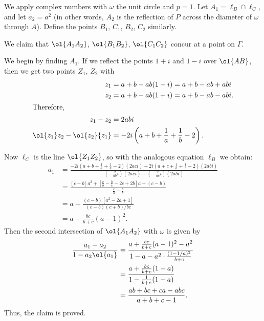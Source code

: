 We apply complex numbers with $\omega$ the unit circle and $p=1$.  Let $A_1 = \ell_B \cap \ell_C$, and let $a_2 = a^2$ (in other words, $A_2$ is the reflection of $P$ across the diameter of $\omega$ through $A$).  Define the points $B_1$, $C_1$, $B_2$, $C_2$ similarly.

We claim that $\ol{A_1A_2}$, $\ol{B_1B_2}$, $\ol{C_1C_2}$ concur at a point on $\Gamma$.

We begin by finding $A_1$. If we reflect the points $1+i$ and $1-i$ over $\ol{AB}$, then we get two points $Z_1$, $Z_2$ with
\begin{align*}
  z_1 &= a+b-ab(1-i) = a+b-ab+abi \\
  z_2 &= a+b-ab(1+i) = a+b-ab-abi. \\
  \intertext{Therefore,}
  z_1 - z_2 &= 2abi  \\
  \ol{z_1}z_2 - \ol{z_2}{z_1}
    &= -2i \left( a+b+\frac1a+\frac1b-2 \right).
\end{align*}

Now $\ell_C$ is the line $\ol{Z_1Z_2}$,
so with the analogous equation $\ell_B$ we obtain:
\begin{align*}
  a_1 &= \frac{ -2i\left( a+b+\frac1a+\frac1b-2 \right)\left( 2ac i \right) +
    2i\left( a+c+\frac1a+\frac1c-2 \right)(2abi) }
    { \left( -\frac{2}{ab}i \right)
    \left( 2ac i \right) - \left( -\frac{2}{ac}i \right) \left( 2abi \right)} \\
  &= \frac{\left[ c-b \right]a^2 + \left[ \frac cb - \frac bc - 2c + 2b \right]a + (c-b)  }{\frac cb - \frac bc} \\
  &= a + \frac{(c-b)\left[ a^2-2a+1 \right]}{(c-b)(c+b)/bc} \\
  &= a + \frac{bc}{b+c} (a-1)^2.
\end{align*}
Then the second intersection of $\ol{A_1A_2}$ with $\omega$ is given by
\begin{align*}
  \frac{a_1-a_2}{1-a_2\ol{a_1}}
  &= \frac{a+\frac{bc}{b+c}(a-1)^2-a^2}{1-a-a^2 \cdot \frac{(1-1/a)^2}{b+c}} \\
  &= \frac{a + \frac{bc}{b+c}(1-a)}{1 - \frac{1}{b+c}(1-a)} \\
  &= \frac{ab+bc+ca - abc}{a+b+c-1}.
\end{align*}
Thus, the claim is proved.

